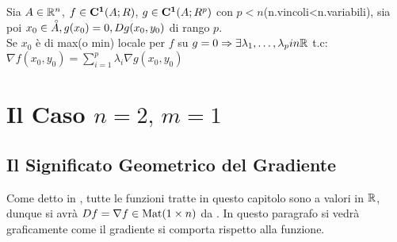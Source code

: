 Sia $A\in \mathbb{R}^n$, $f\in \mathbf{C^{1}}(A;R)$, $g\in \mathbf{C^{1}}(A;R^p)$ con $p<n$(n.vincoli<n.variabili), sia poi $x_0\in\accentset{\circ}{A}, g(x_0)=0, Dg (x_0,y_0)$ di rango $p$.\\
Se $x_0$ è di max(o min) locale per $f$ su $g=0\Rightarrow\exists \lambda_1,\ldots,\lambda_p in \mathbb{R}$ t.c: $\nabla f(x_0,y_0) = \sum\limits_{i=1}^{p}\lambda_i\nabla g(x_0,y_0)$\\

\newpage
\section{Il Caso \texorpdfstring{$n=2,\,m=1$}{n=2, m=1}}


\subsection{Il Significato Geometrico del Gradiente} %
Come detto in , tutte le funzioni tratte in questo capitolo sono a valori in $\mathbb{R}$, dunque si avrà $Df = \nabla f \in \operatorname{Mat}(1 \times n)$ da . In questo paragrafo si vedrà graficamente come il gradiente si comporta rispetto alla funzione.
